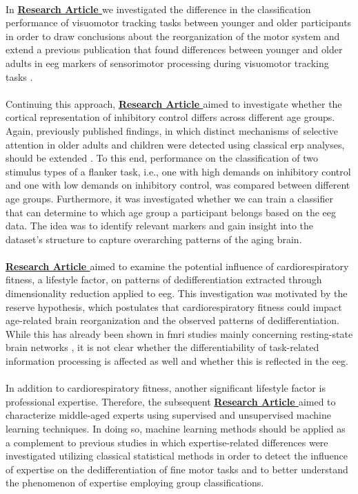 \\
In \textbf{\hyperref[pub:paperI]{Research Article }} we investigated the difference in the classification performance of visuomotor tracking tasks between younger and older participants in order to draw conclusions about the reorganization of the motor system and extend a previous publication that found differences between younger and older adults in \gls{eeg} markers of sensorimotor processing during visuomotor tracking tasks \cite{vieluf2018age}.\\
\\
Continuing this approach, \textbf{\hyperref[pub:paperII]{Research Article }} aimed to investigate whether the cortical representation of inhibitory control differs across different age groups. Again, previously published findings, in which distinct mechanisms of selective attention in older adults and children were detected using classical \gls{erp} analyses, should be extended \cite{Reuter2019}. To this end, performance on the classification of two stimulus types of a flanker task, i.e., one with high demands on inhibitory control and one with low demands on inhibitory control, was compared between different age groups. Furthermore, it was investigated whether we can train a classifier that can determine to which age group a participant belongs based on the \gls{eeg} data. The idea was to identify relevant markers and gain insight into the dataset's structure to capture overarching patterns of the aging brain.\\
\\
\textbf{\hyperref[pub:paperIII]{Research Article }} aimed to examine the potential influence of cardiorespiratory fitness, a lifestyle factor, on patterns of dedifferentiation extracted through dimensionality reduction applied to \gls{eeg}. This investigation was motivated by the reserve hypothesis, which postulates that cardiorespiratory fitness could impact age-related brain reorganization and the observed patterns of dedifferentiation. While this has already been shown in \gls{fmri} studies mainly concerning resting-state brain networks \cite{Stillman2019}, it is not clear whether the differentiability of task-related information processing is affected as well and whether this is reflected in the \gls{eeg}.\\
\\
In addition to cardiorespiratory fitness, another significant lifestyle factor is professional expertise. Therefore, the subsequent \textbf{\hyperref[pub:paperIV]{Research Article }} aimed to characterize middle-aged experts using supervised and unsupervised machine learning techniques. In doing so, machine learning methods should be applied as a complement to previous studies in which expertise-related differences were investigated utilizing classical statistical methods \cite{vieluf2018age, Goelz2018} in order to detect the influence of expertise on the dedifferentiation of fine motor tasks and to better understand the phenomenon of expertise employing group classifications.\\
